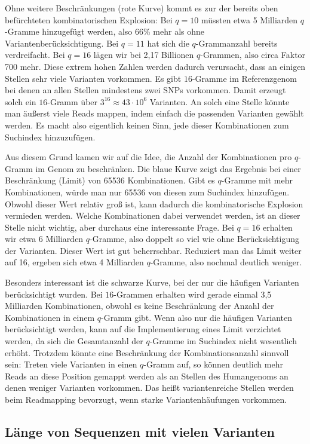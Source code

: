 Ohne weitere Beschränkungen (rote Kurve) kommt es zur der bereits oben befürchteten kombinatorischen Explosion: Bei $q=10$ müssten etwa 5 Milliarden $q$-Gramme hinzugefügt werden, also 66\% mehr als ohne Variantenberücksichtigung. Bei $q=11$ hat sich die $q$-Grammanzahl bereits verdreifacht. Bei $q=16$ lägen wir bei 2,17 Billionen $q$-Grammen, also circa Faktor 700 mehr. Diese extrem hohen Zahlen werden dadurch verursacht, dass an einigen Stellen sehr viele Varianten vorkommen. Es gibt $16$-Gramme im Referenzgenom bei denen an allen Stellen mindestens zwei SNPs vorkommen. Damit erzeugt solch ein $16$-Gramm über $3^{16} \approx 43 \cdot 10^6$ Varianten. An solch eine Stelle könnte man äußerst viele Reads mappen, indem einfach die passenden Varianten gewählt werden. Es macht also eigentlich keinen Sinn, jede dieser Kombinationen zum Suchindex hinzuzufügen.

Aus diesem Grund kamen wir auf die Idee, die Anzahl der Kombinationen pro $q$-Gramm im Genom zu beschränken. Die blaue Kurve zeigt das Ergebnis bei einer Beschränkung (Limit) von 65536 Kombinationen. Gibt es $q$-Gramme mit mehr Kombinationen, würde man nur 65536 von diesen zum Suchindex hinzufügen. Obwohl dieser Wert relativ groß ist, kann dadurch die kombinatorische Explosion vermieden werden. Welche Kombinationen dabei verwendet werden, ist an dieser Stelle nicht wichtig, aber durchaus eine interessante Frage. Bei $q=16$ erhalten wir etwa 6 Milliarden $q$-Gramme, also doppelt so viel wie ohne Berücksichtigung der Varianten. Dieser Wert ist gut beherrschbar. Reduziert man das Limit weiter auf 16, ergeben sich etwa 4 Milliarden $q$-Gramme, also nochmal deutlich weniger.

Besonders interessant ist die schwarze Kurve, bei der nur die häufigen Varianten berücksichtigt wurden. Bei $16$-Grammen erhalten wird gerade einmal 3,5 Milliarden Kombinationen, obwohl es keine Beschränkung der Anzahl der Kombinationen in einem $q$-Gramm gibt. 
Wenn also nur die häufigen Varianten berücksichtigt werden, kann auf die Implementierung eines Limit verzichtet werden, da sich die Gesamtanzahl der $q$-Gramme im Suchindex nicht wesentlich erhöht. Trotzdem könnte eine Beschränkung der Kombinationsanzahl sinnvoll sein: Treten viele Varianten in einen $q$-Gramm auf, so können deutlich mehr Reads an diese Position gemappt werden als an Stellen des Humangenoms an denen weniger Varianten vorkommen. Das heißt variantenreiche Stellen werden beim Readmapping bevorzugt, wenn starke Variantenhäufungen vorkommen.

\subsection{Länge von Sequenzen mit vielen Varianten}
\label{sec:stats:res:nogapseq}

